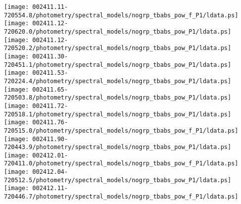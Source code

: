 \documentclass{aastex}
\begin{document}
\begin{figure*}[!ht]
\centering
\texttt{[image: 002411.11-720554.8/photometry/spectral\_models/nogrp\_tbabs\_pow\_f\_P1/ldata.ps]} \hfill 
\texttt{[image: 002411.12-720620.0/photometry/spectral\_models/nogrp\_tbabs\_pow\_P1/ldata.ps]} \hfill 
\texttt{[image: 002411.12-720520.2/photometry/spectral\_models/nogrp\_tbabs\_pow\_P1/ldata.ps]} \\ 
\vspace*{0.5in}
\texttt{[image: 002411.30-720451.1/photometry/spectral\_models/nogrp\_tbabs\_pow\_P1/ldata.ps]} \hfill 
\texttt{[image: 002411.53-720224.4/photometry/spectral\_models/nogrp\_tbabs\_pow\_P1/ldata.ps]} \hfill 
\texttt{[image: 002411.65-720503.8/photometry/spectral\_models/nogrp\_tbabs\_pow\_P1/ldata.ps]} \\ 
\vspace*{0.5in}
\texttt{[image: 002411.72-720518.1/photometry/spectral\_models/nogrp\_tbabs\_pow\_P1/ldata.ps]} \hfill 
\texttt{[image: 002411.76-720515.0/photometry/spectral\_models/nogrp\_tbabs\_pow\_f\_P1/ldata.ps]} \hfill 
\texttt{[image: 002411.90-720443.9/photometry/spectral\_models/nogrp\_tbabs\_pow\_P1/ldata.ps]} \\ 
\vspace*{0.5in}
\texttt{[image: 002412.01-720411.0/photometry/spectral\_models/nogrp\_tbabs\_pow\_f\_P1/ldata.ps]} \hfill 
\texttt{[image: 002412.04-720512.5/photometry/spectral\_models/nogrp\_tbabs\_pow\_P1/ldata.ps]} \hfill 
\texttt{[image: 002412.11-720446.7/photometry/spectral\_models/nogrp\_tbabs\_pow\_f\_P1/ldata.ps]} \\ 
\vspace*{0.5in}
\end{figure*}
\clearpage
\end{document}
